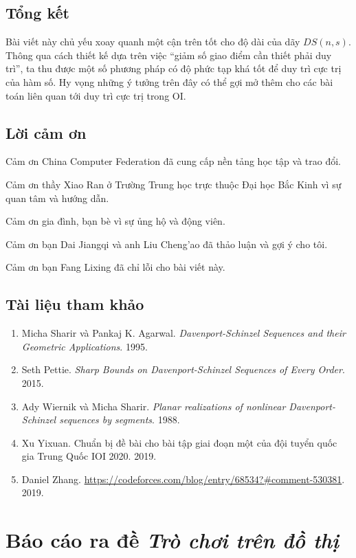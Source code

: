\documentclass[11pt]{article}
\begin{document}
\subsection{Tổng kết}

Bài viết này chủ yếu xoay quanh một cận trên tốt cho độ dài của dãy \(DS(n,s)\).
Thông qua cách thiết kế dựa trên việc ``giảm số giao điểm cần thiết phải duy
trì'', ta thu được một số phương pháp có độ phức tạp khá tốt để duy trì cực trị
của hàm số. Hy vọng những ý tưởng trên đây có thể gợi mở thêm cho các bài toán
liên quan tới duy trì cực trị trong OI.

\subsection{Lời cảm ơn}

Cảm ơn China Computer Federation đã cung cấp nền tảng học tập và trao đổi.

Cảm ơn thầy Xiao Ran ở Trường Trung học trực thuộc Đại học Bắc Kinh vì sự quan
tâm và hướng dẫn.

Cảm ơn gia đình, bạn bè vì sự ủng hộ và động viên.

Cảm ơn bạn Dai Jiangqi và anh Liu Cheng'ao đã thảo luận và gợi ý cho tôi.

Cảm ơn bạn Fang Lixing đã chỉ lỗi cho bài viết này.

\subsection*{Tài liệu tham khảo}

\begin{enumerate}
  \item Micha Sharir và Pankaj K. Agarwal. \emph{Davenport-Schinzel Sequences
  and their Geometric Applications}. 1995.
  \item Seth Pettie. \emph{Sharp Bounds on Davenport-Schinzel Sequences of Every
  Order}. 2015.
  \item Ady Wiernik và Micha Sharir. \emph{Planar realizations of nonlinear
  Davenport-Schinzel sequences by segments}. 1988.
  \item Xu Yixuan. Chuẩn bị đề bài cho bài tập giai đoạn một của đội tuyển quốc
  gia Trung Quốc IOI 2020. 2019.
  \item Daniel Zhang.
  \url{https://codeforces.com/blog/entry/68534?#comment-530381}. 2019.
\end{enumerate}

\section{Báo cáo ra đề \emph{Trò chơi trên đồ thị}}
\end{document}
